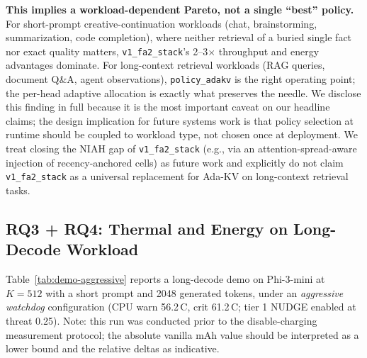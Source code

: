 \documentclass[sigconf, anonymous=false, screen=true]{acmart}
\begin{document}
\noindent\textbf{This implies a workload-dependent Pareto, not a single ``best'' policy.} For short-prompt creative-continuation workloads (chat, brainstorming, summarization, code completion), where neither retrieval of a buried single fact nor exact quality matters, \texttt{v1\_fa2\_stack}'s 2--3$\times$ throughput and energy advantages dominate. For long-context retrieval workloads (RAG queries, document Q\&A, agent observations), \texttt{policy\_adakv} is the right operating point; the per-head adaptive allocation is exactly what preserves the needle. We disclose this finding in full because it is the most important caveat on our headline claims; the design implication for future systems work is that policy selection at runtime should be coupled to workload type, not chosen once at deployment. We treat closing the NIAH gap of \texttt{v1\_fa2\_stack} (e.g., via an attention-spread-aware injection of recency-anchored cells) as future work and explicitly do not claim \texttt{v1\_fa2\_stack} as a universal replacement for Ada-KV on long-context retrieval tasks.

\subsection{RQ3 + RQ4: Thermal and Energy on Long-Decode Workload}

Table~\ref{tab:demo-aggressive} reports a long-decode demo on Phi-3-mini at $K{=}512$ with a short prompt and 2048 generated tokens, under an \emph{aggressive watchdog} configuration (CPU warn 56.2\,\textdegree C, crit 61.2\,\textdegree C; tier 1 NUDGE enabled at threat 0.25). Note: this run was conducted prior to the disable-charging measurement protocol; the absolute vanilla mAh value should be interpreted as a lower bound and the relative deltas as indicative.
\end{document}
